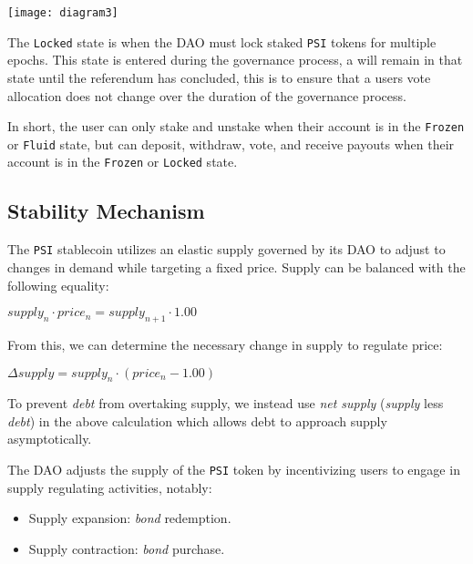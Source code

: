 \documentclass[a4paper, 12pt]{article}
\begin{document}
	\begin{center}

		\texttt{[image: diagram3]}

	\end{center}

	The \texttt{Locked} state is when the DAO must lock staked \texttt{PSI} tokens for multiple epochs. This state is entered during the governance process, a will remain in that state until the 					referendum has concluded, this is to ensure that a users vote allocation does not change over the duration of the governance process.

	In short, the user can only stake and unstake when their account is in the \texttt{Frozen} or \texttt{Fluid} state, but can deposit, withdraw, vote, and receive payouts when their account is in the 				\texttt{Frozen} or \texttt{Locked} state.

	\subsection{Stability Mechanism}
	The \texttt{PSI} stablecoin utilizes an elastic supply governed by its DAO to adjust to changes in demand while targeting a fixed price. Supply can be balanced with the following equality:
	
	\begin{center}

		$supply_n \cdot price_n = supply_{n + 1} \cdot 1.00$
	
	\end{center}

	From this, we can determine the necessary change in supply to regulate price:
	
	\begin{center}

		$\Delta supply = supply_n \cdot (price_n - 1.00)$

	\end{center}

	To prevent \textit{debt} from overtaking supply, we instead use \textit{net supply} (\textit{supply} less \textit{debt}) in the above calculation which allows debt to approach supply asymptotically. 			\newline

 	The DAO adjusts the supply of the \texttt{PSI} token by incentivizing users to engage in supply regulating activities, notably:
	
	\begin{itemize}
	
		\item{Supply expansion: \textit{bond} redemption.}
		\item{Supply contraction: \textit{bond} purchase.}
	
	\end{itemize}
\end{document}
